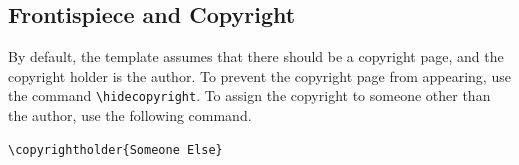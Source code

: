 \subsection{Frontispiece and Copyright}

By default, the template assumes that there should be a copyright page, and the copyright holder is the author.  
To prevent the copyright page from appearing, use the command \verb|\hidecopyright|.  
To assign the copyright to someone other than the author, use the following command.
\begin{verbatim}
\copyrightholder{Someone Else}
\end{verbatim}




